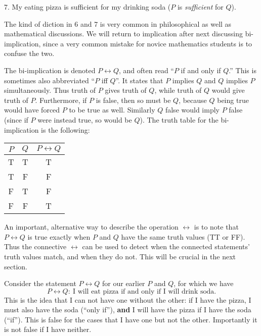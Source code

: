 7. My eating pizza is sufficient for my drinking soda 
       ($P$ is {\it sufficient} for $Q$).\medskip

\noindent The kind of diction in 6 and 7
is very common in philosophical as well as mathematical discussions.
We will return to implication after next discussing bi-implication,
since a very common mistake for novice mathematics students 
is to confuse the two.


The bi-implication is denoted $P\longleftrightarrow Q$, and
often read ``$P$ if and only if $Q$.''  This is sometimes
also abbreviated ``$P$ iff $Q$''.  It states that $P$ implies
$Q$ and $Q$ implies $P$ simultaneously.  Thus truth of $P$ 
gives truth of $Q$, while truth of $Q$ would give truth of $P$.
Furthermore, if $P$ is false, then so must be $Q$, because
$Q$ being true would have forced $P$ to be true as well.  
Similarly $Q$ false 
would imply $P$ false (since if $P$ were instead true, so
would be $Q$).  The truth table for the bi-implication is the
following:
\begin{center}
\medskip

\begin{tabular}{|c|c||c|}\hline 
$P$ &$Q$ &$P\longleftrightarrow Q$\\
\hline
T&T&T\\
T&F&F\\
F&T&F\\
F&F&T\\\hline\end{tabular}
\medskip
\end{center}

An important, alternative
way to describe the operation $\longleftrightarrow$ is
to note that $P\longleftrightarrow Q$  is true exactly when 
$P$ and $Q$ have the same truth values (TT or FF).
Thus the connective $\longleftrightarrow$ can be used to 
detect when the connected statements' truth values match, and when they 
do not.  This will be crucial in the next section.

\bex Consider the statement $P\longleftrightarrow Q$ for
our earlier  $P$ and $Q$, for which we have
$$P\longleftrightarrow Q:\ 
\text{I will eat pizza if and only if I will drink soda.}
$$
This is the idea that I can not have one without the other:
if I have the pizza, I must also have the soda (``only if''),
{\bf and} I will have the pizza if I have the soda (``if'').
This is false for the cases that I have one but not the other.
Importantly it is not false if I have neither.
\label{P<->QExampleAndExplanation}\eex

